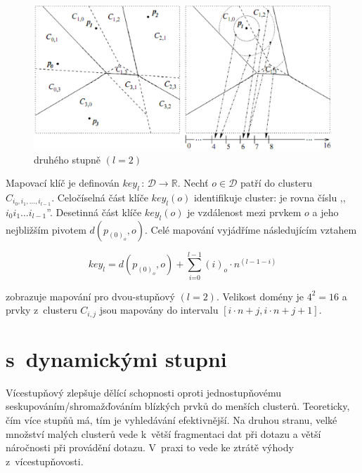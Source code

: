 \begin{figure}[t]
\centering{}\includegraphics[scale=0.5]{m-index-level-two}\caption{\MIndex{} druhého stupně $(l=2)$}
\label{fig:M-Index-level-two}
\end{figure}


Mapovací klíč  je definován $key_{l}\,:\,\mathcal{D\rightarrow\mathbb{R}}$\@.
Nechť $o\in\mathcal{D}$ patří do clusteru $C_{i_{0},i_{1},\ldots,i_{l-1}}$\@.
Celočíselná část klíče $key_{l}(o)$ identifikuje cluster: je rovna
číslu ,,$i_{0}i_{1}\ldots i_{l-1}$''\@. Desetinná část klíče $key_{l}(o)$
je vzdálenost mezi prvkem $o$ a jeho nejbližším pivotem $d(p_{(0)_{o}},o)$\@.
Celé mapování  vyjádříme následujícím vztahem

\begin{equation}
key_{l}=d(p_{(0)_{o}},o)+\sum_{i\text{=0}}^{l-1}(i)_{o}\cdot n{}^{(l-1-i)}\label{eq:M-Index-key}
\end{equation}


 zobrazuje mapování pro dvou-stupňový
\MIndex{} $(l=2)$\@. Velikost domény je $4^{2}=16$ a prvky z~clusteru
$C_{i,j}$ jsou mapovány do intervalu $[i\cdot n+j,i\cdot n+j+1]$\@.


\section{\MIndex{} s~dynamickými stupni\label{sec:Dynamic-Cluster-Tree}}

Vícestupňový \MIndex{} zlepšuje dělící schopnosti oproti jednostupňovému  seskupováním/shromažďováním blízkých prvků do menších clusterů\@.
Teoreticky, čím více stupňů \MIndex{} má, tím je vyhledávání efektivnější.
Na druhou stranu, velké množství malých clusterů vede k~větší fragmentaci dat při dotazu a větší náročnosti při provádění dotazu.
V~praxi to vede ke ztrátě výhody z~vícestupňovosti.

